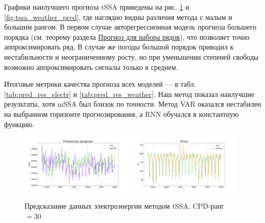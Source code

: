 	Графики наилучшего прогноза tSSA приведены на рис. \ref{fig:tssa_electr_pred} и \ref{fig:tssa_weather_pred}, где наглядно видны различия метода с малым и большим рангом. В первом случае авторегрессионная модель прогноза большего порядка (см. теорему раздела \hyperref[sec:tssa_forecast]{Прогноз для набора рядов}), что позволяет точно аппроксимировать ряд. В случае же погоды большой порядок приводил к нестабильности и неограниченному росту, но при уменьшении степеней свободы возможно аппроксимировать сигналы только в среднем.
	
	Итоговые метрики качества прогноза всех моделей --- в табл. \ref{tab:pred_res_electr} и \ref{tab:pred_res_weather}. Наш метод показал наилучшие результаты, хотя mSSA был близок по точности. Метод VAR оказался нестабилен на выбранном горизонте прогнозирования, а RNN обучался в константную функцию.
	
	\begin{figure}[h]
		\centering
		\includegraphics[width=0.48\textwidth, keepaspectratio]{../../experiments/electricity/tssa/figs/prediction/cpd_rank_30/Production_program.png}
		\includegraphics[width=0.48\textwidth, keepaspectratio]{../../experiments/electricity/tssa/figs/prediction/cpd_rank_30/Price.png}
		\caption{Предсказание данных электроэнергии методом tSSA. CPD-ранг $ = 30 $}\label{fig:tssa_electr_pred}
	\end{figure}
	
